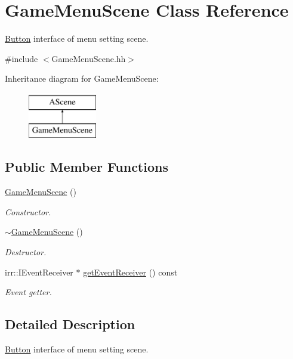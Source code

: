 \hypertarget{classGameMenuScene}{}\section{Game\+Menu\+Scene Class Reference}
\label{classGameMenuScene}


\hyperlink{classButton}{Button} interface of menu setting scene.  




{\ttfamily \#include $<$Game\+Menu\+Scene.\+hh$>$}

Inheritance diagram for Game\+Menu\+Scene\+:\begin{figure}[H]
\begin{center}
\leavevmode
\includegraphics[height=2.000000cm]{classGameMenuScene}
\end{center}
\end{figure}
\subsection*{Public Member Functions}
\begin{DoxyCompactItemize}
\item 
\hyperlink{classGameMenuScene_a990633f8037ab2691f0aca251f3d89ee}{Game\+Menu\+Scene} ()
\begin{DoxyCompactList}\small\item\em Constructor. \end{DoxyCompactList}\item 
\hyperlink{classGameMenuScene_afbc6eddfe5f84b6f0b21bc652c9fc435}{$\sim$\+Game\+Menu\+Scene} ()
\begin{DoxyCompactList}\small\item\em Destructor. \end{DoxyCompactList}\item 
irr\+::\+I\+Event\+Receiver $\ast$ \hyperlink{classGameMenuScene_adcb01430b24486c4e5d0157fc32d7611}{get\+Event\+Receiver} () const
\begin{DoxyCompactList}\small\item\em Event getter. \end{DoxyCompactList}\end{DoxyCompactItemize}


\subsection{Detailed Description}
\hyperlink{classButton}{Button} interface of menu setting scene. 


